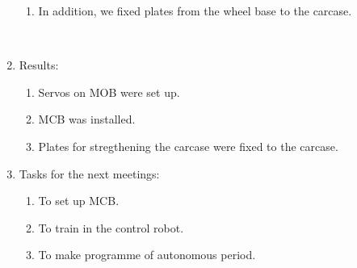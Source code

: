 \begin{enumerate}
\begin{enumerate}
        \item In addition, we fixed plates from the wheel base to the carcase.
        \begin{figure}[H]
        	\begin{minipage}[h]{0.2\linewidth}
        		\center  
        	\end{minipage}
        	\begin{minipage}[h]{0.6\linewidth}
        		\caption{}
        	\end{minipage}
        \end{figure}

	\end{enumerate}
	
	\item Results:
	\begin{enumerate}
		
		\item Servos on MOB were set up.
		
		\item MCB was installed.
		
		\item Plates for stregthening the carcase were fixed to the carcase.
		
	\end{enumerate}
	
	\item Tasks for the next meetings:
	\begin{enumerate}
		
		\item To set up MCB.
		
		\item To train in the control robot.
		
        \item To make programme of autonomous period.
			
	\end{enumerate}
\end{enumerate}
\fillpage
